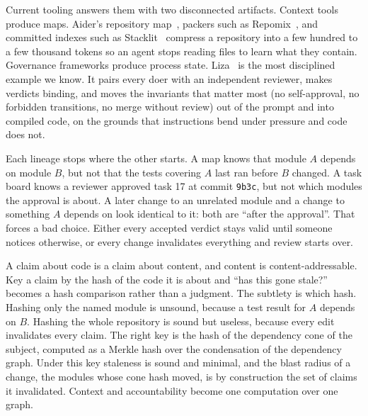 \documentclass[conference]{IEEEtran}
\begin{document}
Current tooling answers them with two disconnected artifacts. Context tools produce maps. Aider's repository map~\citep{aider}, packers such as Repomix~\citep{repomix}, and committed indexes such as Stacklit~\citep{stacklit} compress a repository into a few hundred to a few thousand tokens so an agent stops reading files to learn what they contain. Governance frameworks produce process state. Liza~\citep{liza} is the most disciplined example we know. It pairs every doer with an independent reviewer, makes verdicts binding, and moves the invariants that matter most (no self-approval, no forbidden transitions, no merge without review) out of the prompt and into compiled code, on the grounds that instructions bend under pressure and code does not.

Each lineage stops where the other starts. A map knows that module $A$ depends on module $B$, but not that the tests covering $A$ last ran before $B$ changed. A task board knows a reviewer approved task 17 at commit \texttt{9b3c}, but not which modules the approval is about. A later change to an unrelated module and a change to something $A$ depends on look identical to it: both are ``after the approval''. That forces a bad choice. Either every accepted verdict stays valid until someone notices otherwise, or every change invalidates everything and review starts over.

A claim about code is a claim about content, and content is content-addressable. Key a claim by the hash of the code it is about and ``has this gone stale?'' becomes a hash comparison rather than a judgment. The subtlety is which hash. Hashing only the named module is unsound, because a test result for $A$ depends on $B$. Hashing the whole repository is sound but useless, because every edit invalidates every claim. The right key is the hash of the dependency cone of the subject, computed as a Merkle hash over the condensation of the dependency graph. Under this key staleness is sound and minimal, and the blast radius of a change, the modules whose cone hash moved, is by construction the set of claims it invalidated. Context and accountability become one computation over one graph.
\end{document}
